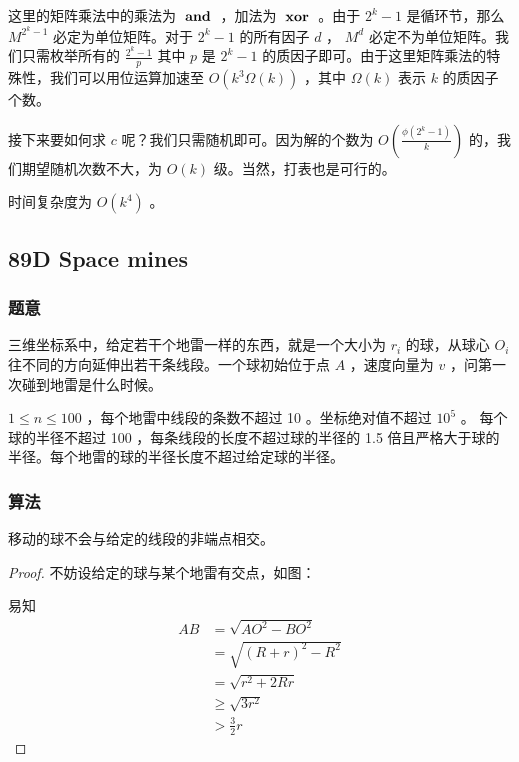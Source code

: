 \documentclass[11pt]{article}
\begin{document}
    这里的矩阵乘法中的乘法为 $\hspace{0.1cm} \textbf{and} \hspace{0.1cm}$ ，加法为 $\hspace{0.1cm} \textbf{xor} \hspace{0.1cm}$ 。由于 $2^k - 1$ 是循环节，那么 $M^{2^k - 1}$ 必定为单位矩阵。对于 $2^k - 1$ 的所有因子 $d$ ， $M^d$ 必定不为单位矩阵。我们只需枚举所有的 $\frac{2^k - 1}{p}$ 其中 $p$ 是 $2^k - 1$ 的质因子即可。由于这里矩阵乘法的特殊性，我们可以用位运算加速至 $O(k^3 \Omega(k))$ ，其中 $\Omega(k)$ 表示 $k$ 的质因子个数。

    接下来要如何求 $c$ 呢？我们只需随机即可。因为解的个数为 $O(\frac{\phi(2^k - 1)}{k})$ 的，我们期望随机次数不大，为 $O(k)$ 级。当然，打表也是可行的。

    时间复杂度为 $O(k^4)$ 。
\subsection{89D   Space mines}
\label{sec-6-7}
\subsubsection{题意}
\label{sec-6-7-1}

    三维坐标系中，给定若干个地雷一样的东西，就是一个大小为 $r_i$ 的球，从球心 $O_i$ 往不同的方向延伸出若干条线段。一个球初始位于点 $A$ ，速度向量为 $v$ ，问第一次碰到地雷是什么时候。

    $1 \leq n \leq 100$ ，每个地雷中线段的条数不超过 10 。坐标绝对值不超过 $10^5$ 。 每个球的半径不超过 100 ，每条线段的长度不超过球的半径的 1.5 倍且严格大于球的半径。每个地雷的球的半径长度不超过给定球的半径。
\subsubsection{算法}
\label{sec-6-7-2}

\begin{theorem}
  移动的球不会与给定的线段的非端点相交。
\end{theorem}
\begin{proof}
  不妨设给定的球与某个地雷有交点，如图：
\begin{center}

\end{center}
  易知
\begin{equation}
  \begin{aligned}
     AB &= \sqrt{AO^2 - BO^2} \\
        &= \sqrt{(R + r)^2 - R^2} \\
        &= \sqrt{r^2 + 2Rr} \\
        &\geq \sqrt{3r^2} \\
        &> \frac{3}{2} r
  \end{aligned}
\end{equation}

\end{proof}
\end{document}
